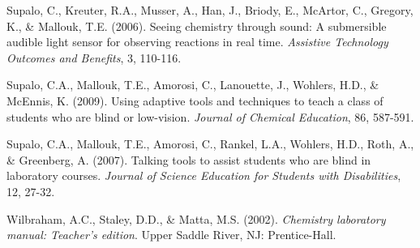\documentclass[11.5pt]{sig-alternate} %
\begin{document}
Supalo, C., Kreuter, R.A., Musser, A., Han, J., Briody, E., McArtor, C., Gregory, K., \& Mallouk, T.E. (2006). Seeing chemistry through sound: A submersible audible light sensor for observing reactions in real time. \textit{Assistive Technology Outcomes and Benefits}, 3, 110-116.

Supalo, C.A., Mallouk, T.E., Amorosi, C., Lanouette, J., Wohlers, H.D., \& McEnnis, K. (2009). Using adaptive tools and techniques to teach a class of students who are blind or low-vision. \textit{Journal of Chemical Education}, 86, 587-591.

Supalo, C.A., Mallouk, T.E., Amorosi, C., Rankel, L.A., Wohlers, H.D., Roth, A., \& Greenberg, A. (2007). Talking tools to assist students who are blind in laboratory courses. \textit{Journal of Science Education for Students with Disabilities}, 12, 27-32.

Wilbraham, A.C., Staley, D.D., \& Matta, M.S. (2002). \textit{Chemistry laboratory manual: Teacher’s edition}. Upper Saddle River, NJ: Prentice-Hall.
\end{document}
